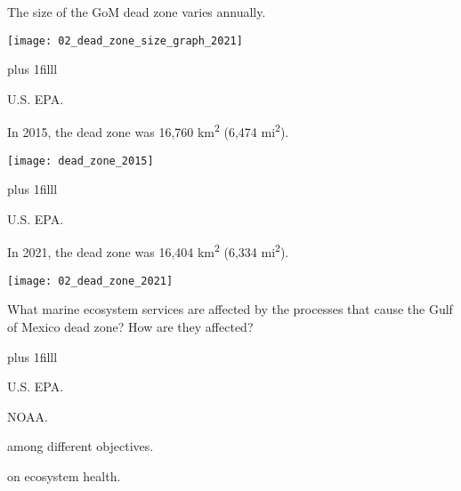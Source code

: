\documentclass[t]{beamer}
\begin{document}
\begin{frame}[t]{The size of the GoM dead zone varies annually.}

	\texttt{[image: 02\_dead\_zone\_size\_graph\_2021]}
	
	\vskip0pt plus 1filll

\hfill\tiny U.S. EPA.
\end{frame}

\begin{frame}[t]{In 2015, the dead zone was 16,760 km\textsuperscript{2} (6,474 mi\textsuperscript{2}).}

	\texttt{[image: dead\_zone\_2015]}
	
	
	\vskip0pt plus 1filll

\hfill\tiny U.S. EPA.
\end{frame}

\begin{frame}[t]{In 2021, the dead zone was 16,404 km\textsuperscript{2} (6,334 mi\textsuperscript{2}).}

	\texttt{[image: 02\_dead\_zone\_2021]}
	
	{\large What marine ecosystem services are affected by the processes that cause the Gulf of Mexico dead zone? How are they affected?}
	
	\vskip0pt plus 1filll

\hfill\tiny U.S. EPA.
\end{frame}



{
\begin{frame}[b]
\hfill\tiny NOAA.
\end{frame}
}



{
\begin{frame}[t]{ among different objectives.}
\end{frame}
}

{
\begin{frame}[t]{ on ecosystem health.}
\end{frame}
}
\end{document}
